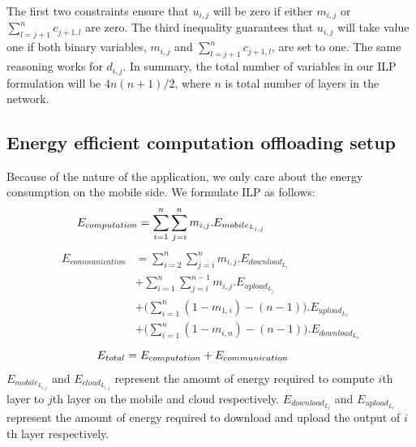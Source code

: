 \documentclass[conference,9pt]{IEEEtran}
\begin{document}
 The first two constraints ensure that $u_{i,j}$ will be zero if either $m_{i,j}$ or $\sum_{l=j+1}^{n}{c_{j+1,l}}$ are zero. The third inequality guarantees that $u_{i,j}$ will take value one if both binary variables, $m_{i,j}$ and $\sum_{l=j+1}^{n}{c_{j+1,l}}$, are set to one. The same reasoning works for $d_{i,j}$. In summary, the total number of variables in our ILP formulation will be $4n(n+1)/2$, where $n$ is total number of layers in the network.
\subsection{Energy efficient computation offloading setup}
Because of the nature of the application, we only care about the energy consumption on the mobile side. We formulate ILP as follows:
  \begin{equation}
      \begin{split}
E_{computation} &= \sum_{i=1}^{n}{\sum_{j=i}^{n}{
m_{i,j}.E_{mobile_{L_{i,j}}}}\thinspace\thinspace\thinspace\thinspace\thinspace\thinspace\thinspace\thinspace\thinspace\thinspace\thinspace\thinspace\thinspace\thinspace\thinspace\thinspace\thinspace\thinspace\thinspace\thinspace\thinspace\thinspace\thinspace\thinspace\thinspace\thinspace\thinspace\thinspace\thinspace\thinspace\thinspace\thinspace\thinspace\thinspace\thinspace\thinspace}\label{eq: energy_comp}
  \end{split}
\end{equation}
  \begin{equation}
      \begin{split}
E_{communication} &= \sum_{i=2}^{n}{\sum_{j=i}^{n}{m_{i,j}.E_{download_{L_i}}}} \\
& + \sum_{i=1}^{n}{\sum_{j=i}^{n-1}{m_{i,j}.E_{upload_{L_j}}}} \\
& + (\sum_{i=1}^{n}{(1-m_{1,i}) - (n-1)).E_{upload_{L_1}}} \\
& + (\sum_{i=1}^{n}{(1-m_{i,n}) - (n-1)).E_{download_{L_n}}}\label{eq: energy_comm}
  \end{split}
\end{equation}
  \begin{equation}
E_{total} = E_{computation} + E_{communication}\thinspace\thinspace\thinspace\thinspace\thinspace\thinspace\thinspace\thinspace\thinspace\thinspace\thinspace\thinspace\thinspace\thinspace\thinspace\thinspace\thinspace\thinspace\thinspace
\end{equation}
$E_{mobile_{L_{i,j}}}$ and $E_{cloud_{L_{i,j}}}$ represent the amount of energy required to compute $i$th layer to $j$th layer on the mobile and cloud respectively. $E_{download_{L_i}}$ and $E_{upload_{L_i}}$ represent the amount of energy required to download and upload the output of $i$th layer respectively.
\end{document}
